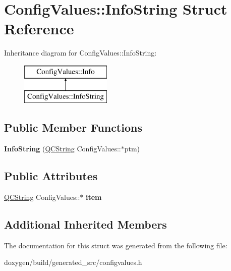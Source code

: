 \hypertarget{struct_config_values_1_1_info_string}{}\section{Config\+Values\+::Info\+String Struct Reference}
\label{struct_config_values_1_1_info_string}
Inheritance diagram for Config\+Values\+::Info\+String\+:\begin{figure}[H]
\begin{center}
\leavevmode
\includegraphics[height=2.000000cm]{struct_config_values_1_1_info_string}
\end{center}
\end{figure}
\subsection*{Public Member Functions}
\begin{DoxyCompactItemize}
\item 
\mbox{\label{struct_config_values_1_1_info_string_aecbe8d75747e5aaedd19bfd349acfbd7}} 
{\bfseries Info\+String} (\mbox{\hyperlink{class_q_c_string}{Q\+C\+String}} Config\+Values\+::$\ast$ptm)
\end{DoxyCompactItemize}
\subsection*{Public Attributes}
\begin{DoxyCompactItemize}
\item 
\mbox{\label{struct_config_values_1_1_info_string_af9b75f91615ac3a3fb385862ecdf795d}} 
\mbox{\hyperlink{class_q_c_string}{Q\+C\+String}} Config\+Values\+::$\ast$ {\bfseries item}
\end{DoxyCompactItemize}
\subsection*{Additional Inherited Members}


The documentation for this struct was generated from the following file\+:\begin{DoxyCompactItemize}
\item 
doxygen/build/generated\+\_\+src/configvalues.\+h\end{DoxyCompactItemize}
